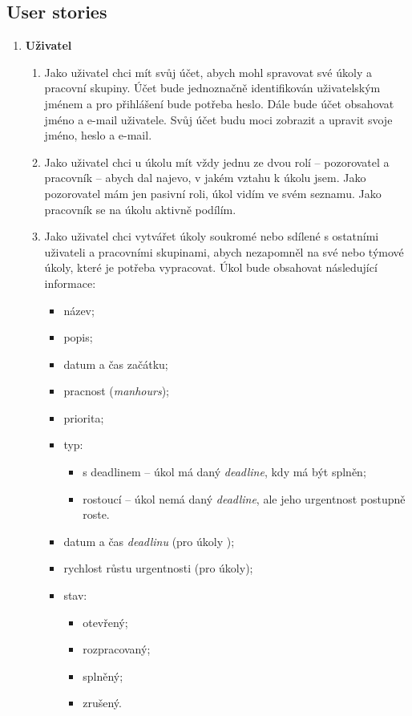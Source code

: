 \documentclass[thesis=B,czech]{FITthesis}[2012/06/26]
\begin{document}
		\subsection{User stories}
		\label{sec:user-stories}
		\begin{enumerate}
			\item \textbf{Uživatel}
			\begin{enumerate}
				\item Jako uživatel chci mít svůj účet, abych mohl spravovat své úkoly a pracovní skupiny. Účet bude jednoznačně identifikován uživatelským jménem a pro přihlášení bude potřeba heslo. Dále bude účet obsahovat jméno a e-mail uživatele. Svůj účet budu moci zobrazit a upravit svoje jméno, heslo a e-mail.
				
				\item Jako uživatel chci u úkolu mít vždy jednu ze dvou rolí -- pozorovatel a pracovník -- abych dal najevo, v jakém vztahu k úkolu jsem. Jako pozorovatel mám jen pasivní roli, úkol vidím ve svém seznamu. Jako pracovník se na úkolu aktivně podílím.
				
				\item Jako uživatel chci vytvářet úkoly soukromé nebo sdílené s ostatními uživateli a pracovními skupinami, abych nezapomněl na své nebo týmové úkoly, které je potřeba vypracovat. Úkol bude obsahovat následující informace:
				\begin{itemize}
					\item název;
					\item popis;
					\item datum a čas začátku;
					\item pracnost (\textit{manhours});
					\item priorita;
					\item typ:
					\begin{itemize}
						\item s deadlinem -- úkol má daný \textit{deadline}, kdy má být splněn;
						\item rostoucí -- úkol nemá daný \textit{deadline}, ale jeho urgentnost postupně roste.
					\end{itemize}
					\item datum a čas \textit{deadlinu} (pro úkoly );
					\item rychlost růstu urgentnosti (pro  úkoly);
					\item stav:
					\begin{itemize}
						\item otevřený;
						\item rozpracovaný;
						\item splněný;
						\item zrušený.
					\end{itemize}
				\end{itemize}
				

\end{enumerate}
\end{enumerate}
\end{document}
